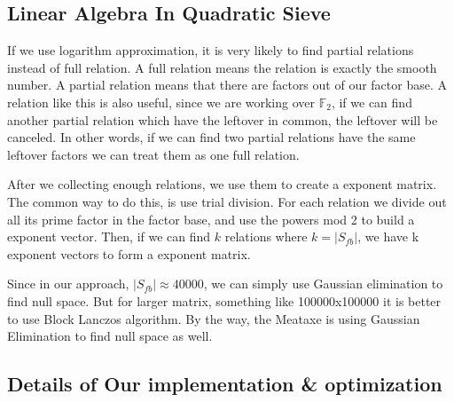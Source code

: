 \documentclass[12pt]{article} %
\begin{document}
\subsection {Linear Algebra In Quadratic Sieve}

If we use logarithm approximation, it is very likely to find partial relations instead of full relation. A full relation means the relation is exactly the smooth number. A partial relation means that there are factors out of our factor base. A relation like this is also useful, since we are working over $\mathbb{F}_2$, if we can find another partial relation which have the leftover in common, the leftover will be canceled. In other words, if we can find two partial relations have the same leftover factors we can treat them as one full relation.

After we collecting enough relations, we use them to create a exponent matrix. The common way to do this, is use trial division. For each relation we divide out all its  prime factor in the factor base, and use the powers mod 2 to build a exponent vector. 
Then, if we can find $k$ relations where $k = |S_{fb}|$, we have k exponent vectors to form a exponent matrix. 

Since in our approach, $|S_{fb}|\approx 40000$, we can simply use Gaussian elimination to find null space. But for larger matrix, something like 100000x100000 it is better to use Block Lanczos algorithm. By the way, the Meataxe is using Gaussian Elimination to find null space as well.

\subsection {Details of Our implementation \& optimization}
\end{document}
